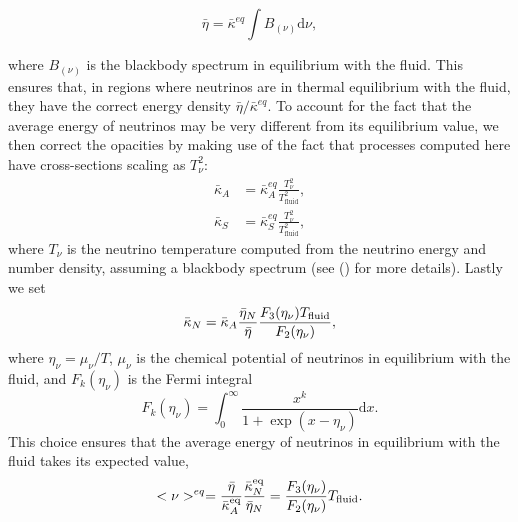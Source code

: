 %
\begin{equation}
\bar \eta = \bar\kappa^{eq}\int B_{(\nu)}\mathrm{d}\nu,
\end{equation}

where $B_{(\nu)}$ is the blackbody spectrum in equilibrium with the fluid. This ensures that, in regions where neutrinos are in thermal equilibrium with the fluid, they have the correct energy density $\bar \eta/\bar\kappa^{eq}$. To account for the fact that the average energy of neutrinos may be very different from its equilibrium value, we then correct the opacities by making use of the fact that processes computed here have cross-sections scaling as $T_\nu^2$:
%
%
\begin{align}
   \bar \kappa_A &= \bar \kappa^{eq}_A\frac{T_\nu^2}{T_{\text{fluid}}^2}, \\
  \bar \kappa_S &= \bar \kappa^{eq}_S\frac{T_\nu^2}{T_{\text{fluid}}^2},
\end{align}
%
where $T_\nu$ is the neutrino temperature computed from the neutrino energy and number density, assuming a blackbody spectrum (see (\citet*{foucart2016impact}) for more details). Lastly we set
%
\begin{equation}
\bar \kappa_N = \bar \kappa_A \frac{\bar\eta_N}{\bar\eta}\frac{F_3(\eta_\nu)T_{\rm fluid}}{F_2(\eta_\nu)},
\end{equation}
%
where $\eta_\nu = \mu_\nu/T$, $\mu_\nu$ is the chemical potential of neutrinos in equilibrium with the fluid, and $F_k(\eta_\nu)$ is the Fermi integral
%
\begin{equation}
F_k(\eta_\nu) = \int^\infty_0\frac{x^k}{1 + \exp(x - \eta_\nu)}\mathrm{d}x.
\end{equation}
This choice ensures that the average energy of neutrinos in equilibrium with the fluid takes its expected value,
\begin{equation}
<\nu>^{eq} = \frac{\bar \eta}{\bar \kappa_A^{\rm eq}} \frac{\bar \kappa_N^{\rm eq}}{\bar \eta_N} = \frac{F_3(\eta_\nu)}{F_2(\eta_\nu)} T_{\rm fluid}.
\end{equation}

